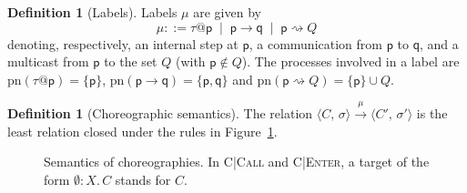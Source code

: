 \documentclass[11pt]{article}
\makeatletter
\theoremstyle{plain}
\theoremstyle{definition}
\newtheorem{definition}[theorem]{Definition}
\theoremstyle{remark}
\newcommand{\kw}[1]{\mathsf{#1}}
\newcommand{\kif}{\kw{if}\;}
\newcommand{\kthen}{\;\kw{then}\;}
\newcommand{\kelse}{\;\kw{else}\;}
\newcommand{\seq}{;\;}
\newcommand{\pp}{\mathsf{p}}
\newcommand{\qq}{\mathsf{q}}
\newcommand{\pn}{\mathrm{pn}}
\newcommand{\eval}[3]{#1 \downarrow_{#2} #3}
\newcommand{\conf}[2]{\langle #1,\, #2\rangle}
\newcommand{\lto}[1]{\xrightarrow{\;#1\;}}
\newcommand{\tauat}[1]{\tau\mathord{@}#1}
\newcommand{\cast}[2]{#1 \rightsquigarrow #2}
\newcommand{\upd}[3]{#1[#2 \mapsto #3]}
\newcommand{\rn}[1]{{\normalfont\scshape #1}}
\newcommand{\ifcond}[3]{\kif #1 \kthen #2 \kelse #3}
\newcommand{\Defs}{\mathcal{C}}
\newcommand{\body}[1]{\Defs(#1)}
\newcommand{\rt}[3]{#1\mathbin{:}#2.\,#3}
\makeatother
\begin{document}
\begin{definition}[Labels]\label{def:labels}
  Labels $\mu$ are given by
  \[
    \mu ::= \tauat{\pp} \;\mid\; \pp \to \qq \;\mid\; \cast{\pp}{Q}
  \]
  denoting, respectively, an internal step at $\pp$, a communication from
  $\pp$ to $\qq$, and a multicast from $\pp$ to the set $Q$ (with $\pp\notin Q$).
  The processes involved in a label are
  $\pn(\tauat{\pp}) = \{\pp\}$, $\pn(\pp\to\qq) = \{\pp,\qq\}$ and
  $\pn(\cast{\pp}{Q}) = \{\pp\}\cup Q$.
\end{definition}

\begin{definition}[Choreographic semantics]\label{def:chor-sem}
  The relation $\conf{C}{\sigma} \lto{\mu} \conf{C'}{\sigma'}$ is the least
  relation closed under the rules in Figure~\ref{fig:chor-sem}.
\end{definition}

\begin{figure}[t]
\caption{Semantics of choreographies.  In \rn{C|Call} and \rn{C|Enter}, a
target of the form $\rt{\emptyset}{X}{C}$ stands for $C$.}
\label{fig:chor-sem}
\end{figure}
\end{document}
